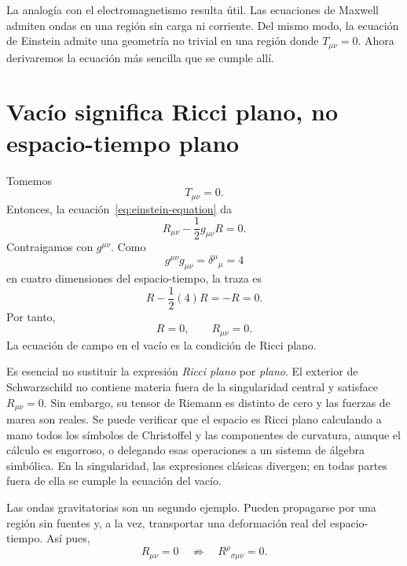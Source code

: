 La analogía con el electromagnetismo resulta útil. Las ecuaciones de Maxwell admiten ondas en una región sin carga ni corriente. Del mismo modo, la ecuación de Einstein admite una geometría no trivial en una región donde \(T_{\mu\nu}=0\). Ahora derivaremos la ecuación más sencilla que se cumple allí.

\section{Vacío significa Ricci plano, no espacio-tiempo plano}

Tomemos
\begin{equation}
 T_{\mu\nu}=0.
\end{equation}
Entonces, la ecuación~\eqref{eq:einstein-equation} da
\begin{equation}
 R_{\mu\nu}-\frac12g_{\mu\nu}R=0.
 \label{eq:vacuum-einstein}
\end{equation}
Contraigamos con \(g^{\mu\nu}\). Como
\begin{equation}
 g^{\mu\nu}g_{\mu\nu}
 =\delta^\mu{}_\mu=4
\end{equation}
en cuatro dimensiones del espacio-tiempo, la traza es
\begin{equation}
 R-\frac12(4)R=-R=0.
\end{equation}
Por tanto,
\begin{equation}
 R=0,
 \qquad
 R_{\mu\nu}=0.
 \label{eq:ricci-flat}
\end{equation}
La ecuación de campo en el vacío es la condición de Ricci plano.

Es esencial no sustituir la expresión \emph{Ricci plano} por \emph{plano}.
El exterior de Schwarzschild no contiene materia fuera de la singularidad central y satisface \(R_{\mu\nu}=0\). Sin embargo, su tensor de Riemann es distinto de cero y las fuerzas de marea son reales. Se puede verificar que el espacio es Ricci plano calculando a mano todos los símbolos de Christoffel y las componentes de curvatura, aunque el cálculo es engorroso, o delegando esas operaciones a un sistema de álgebra simbólica. En la singularidad, las expresiones clásicas divergen; en todas partes fuera de ella se cumple la ecuación del vacío.

Las ondas gravitatorias son un segundo ejemplo. Pueden propagarse por una región sin fuentes y, a la vez, transportar una deformación real del espacio-tiempo. Así pues,
\begin{equation}
 R_{\mu\nu}=0
 \quad\not\Rightarrow\quad
 R^\rho{}_{\sigma\mu\nu}=0.
\end{equation}

